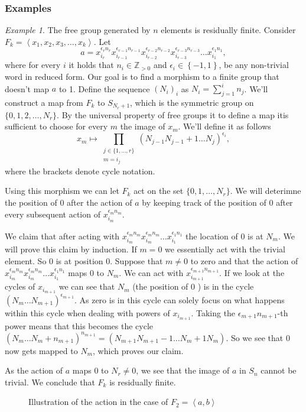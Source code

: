\documentclass[titlepage, a4paper]{article}
\newcommand{\Z}{\mathbb{Z}}
\theoremstyle{remark}
\newtheorem{example}{Example}
\begin{document}
\subsubsection{Examples}

\begin{example}
	The free group generated by $n$ elements is residually finite. 
	Consider $F_k = \left<x_1, x_2, x_3, \ldots, x_k \right>$.
Let \[
a = x_{i_r}^{\epsilon_r n_r}x_{i_{r-1}}^{\epsilon_{r-1}n_{r-1}}x_{i_{r-2}}^{\epsilon_{r-2}n_{r-2}}x_{i_{r-3}}^{\epsilon_{r-3}n_{r-3}} \ldots x_{i_1}^{\epsilon_1n_1}
,\]
where for every $i$ it holds that $n_i \in \Z_{>0}$ and $\epsilon_i \in \left\{ -1,1 \right\} $, be any non-trivial word in reduced form. 
Our goal is to find a morphism to a finite group that doesn't map $a$ to 1. 
Define the sequence $(N_i)_i$ as $N_i = \sum_{j = 1}^{i} n_j$. 
We'll construct a map from $F_k$ to $S_{N_r + 1}$, which is the symmetric group on $\{0,1, 2, \ldots, N_{r}\} $.
By the universal property of free groups it to define a map itis sufficient to choose for every $m$ the image of $x_m$.
We'll define it as follows
\[
x_m \mapsto \prod_{\substack{j \in \{1,\ldots, r\} \\ m = i_j} } (N_{j-1} N_{j-1}+1 \ldots N_{j})^{\epsilon_i}
,\] 
where the brackets denote cycle notation.

Using this morphism we can let $F_k$ act on the set $\{0,1,\ldots, N_r\} $. 
We will deterimne the position of $0$ after the action of $a$ by keeping track of the position of $0$ after every subsequent  action of  $x_{i_m}^{\epsilon_m n_m}$.

We claim that after acting with $x_{i_{m}}^{\epsilon_{m}n_{m}}x_{i_{m}}^{\epsilon_{m}n_{m}} \ldots x_{i_1}^{\epsilon_1n_1}$ the location of  $0$ is at $N_m$.
We will prove this claim by induction.
If  $m=0$ we essentially act with the trivial element. So $0$ is at position $0$.
 Suppose that $m \ne 0$ to zero and that the action of $x_{i_{m}}^{\epsilon_{m}n_{m}}x_{i_{m}}^{\epsilon_{m}n_{m}} \ldots x_{i_1}^{\epsilon_1n_1}$ maps $0$ to $N_m$. 
 We can act with  $x_{i_{m+1}}^{\epsilon_{m+1}n_{m+1}}$. 
 If we look at the cycles of $x_{i_{m+1}}$ we can see that $N_m$ (the position of  $0$ ) is in the cycle $(N_m \ldots N_{m+1})^{\epsilon_{m+1}}$. As zero is in this cycle can solely focus on what happens within this cycle when dealing with powers of $x_{i_{m+1}}$. 
 Taking the $\epsilon _{m+1} n_{m+1}$-th power means that this becomes the cycle $(N_m \ldots N_{m} + n_{m+1})^{n_{m+1}} = (N_{m+1} N_{m+1}-1 \ldots N_m + 1 N_m)$. 
So we see that $0$ now gets mapped to $N_m$, which proves our claim.

As the action of  $a$ maps $0$ to $N_r \ne 0$, we see that the image of  $a$ in  $S_n$ cannot be trivial. 
We conclude that $F_k$ is residually finite.

\begin{figure}[ht]
	\centering
	
	\caption{Illustration of the action in the case of $F_2 = \left<a,b \right>$}
	\label{fig:}
\end{figure}

\end{example}
\end{document}
